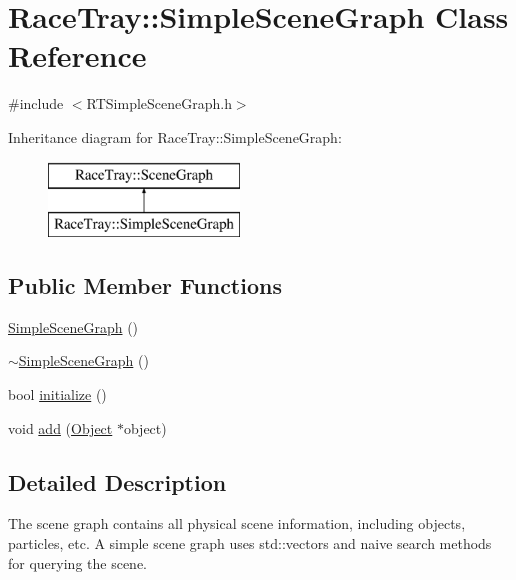 \hypertarget{class_race_tray_1_1_simple_scene_graph}{\section{Race\-Tray\-:\-:Simple\-Scene\-Graph Class Reference}
\label{class_race_tray_1_1_simple_scene_graph}
}


{\ttfamily \#include $<$R\-T\-Simple\-Scene\-Graph.\-h$>$}

Inheritance diagram for Race\-Tray\-:\-:Simple\-Scene\-Graph\-:\begin{figure}[H]
\begin{center}
\leavevmode
\includegraphics[height=2.000000cm]{class_race_tray_1_1_simple_scene_graph}
\end{center}
\end{figure}
\subsection*{Public Member Functions}
\begin{DoxyCompactItemize}
\item 
\hyperlink{class_race_tray_1_1_simple_scene_graph_a52781b41db73fe219fd5028811292dcb}{Simple\-Scene\-Graph} ()
\item 
\hyperlink{class_race_tray_1_1_simple_scene_graph_a80dbbdc5a7736f2b527ffe1b59d77c85}{$\sim$\-Simple\-Scene\-Graph} ()
\item 
bool \hyperlink{class_race_tray_1_1_simple_scene_graph_a0e8c2a6b8224a7fa473f729a781c372a}{initialize} ()
\item 
void \hyperlink{class_race_tray_1_1_simple_scene_graph_a5e10feecf7d0ddaa420bcdee20a4e4dc}{add} (\hyperlink{class_race_tray_1_1_object}{Object} $\ast$object)
\end{DoxyCompactItemize}


\subsection{Detailed Description}
The scene graph contains all physical scene information, including objects, particles, etc. A simple scene graph uses std\-::vectors and naive search methods for querying the scene. 


